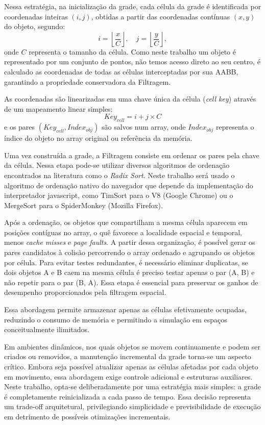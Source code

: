Nessa estratégia, na inicialização da grade, cada célula da grade é identificada por coordenadas inteiras $(i, j)$, obtidas a partir das coordenadas contínuas $(x, y)$ do objeto, segundo:
$$
i = \left\lfloor \frac{x}{C} \right\rfloor, \quad
j = \left\lfloor \frac{y}{C} \right\rfloor,
$$
onde $C$ representa o tamanho da célula. Como neste trabalho um objeto é representado por um conjunto de pontos, não temos acesso direto ao seu centro, é calculado as coordenadas de todas as células interceptadas por sua AABB, garantindo a propriedade conservadora da Filtragem.

As coordenadas são linearizadas em uma chave única da célula (\textit{cell key}) através de um mapeamento linear simples:
$$Key_{cell} = i + j \times C$$
e os pares $(Key_{cell}, Index_{obj})$ são salvos num array, onde $Index_{obj}$ representa o índice do objeto no array original ou referência da memória.

Uma vez construída a grade, a Filtragem consiste em ordenar os pares pela chave da célula. Nessa etapa pode-se utilizar diversos algoritmos de ordenação encontrados na literatura como o \textit{Radix Sort}. Neste trabalho será usado o algoritmo de ordenação nativo do navegador que depende da implementação do interpretador javascript, como TimSort para o V8 (Google Chrome) ou o MergeSort para o SpiderMonkey (Mozilla Firefox).

Após a ordenação, os objetos que compartilham a mesma célula aparecem em posições contíguas no array, o quê favorece a localidade espacial e temporal, menos \textit{cache misses} e \textit{page faults}. A partir dessa organização, é possível gerar os pares candidatos à colisão percorrendo o array ordenado e agrupando os objetos por célula. Para evitar testes redundantes, é necessário eliminar duplicatas, se dois objetos A e B caem na mesma célula é preciso testar apenas o par (A, B) e não repetir para o par (B, A). Essa etapa é essencial para preservar os ganhos de desempenho proporcionados pela filtragem espacial. 

Essa abordagem permite armazenar apenas as células efetivamente ocupadas, reduzindo o consumo de memória e permitindo a simulação em espaços conceitualmente ilimitados.

Em ambientes dinâmicos, nos quais objetos se movem continuamente e podem ser criados ou removidos, a manutenção incremental da grade torna-se um aspecto crítico. Embora seja possível atualizar apenas as células afetadas por cada objeto em movimento, essa abordagem exige controle adicional e estruturas auxiliares. Neste trabalho, opta-se deliberadamente por uma estratégia mais simples: a grade é completamente reinicializada a cada passo de tempo. Essa decisão representa um trade-off arquitetural, privilegiando simplicidade e previsibilidade de execução em detrimento de possíveis otimizações incrementais.

